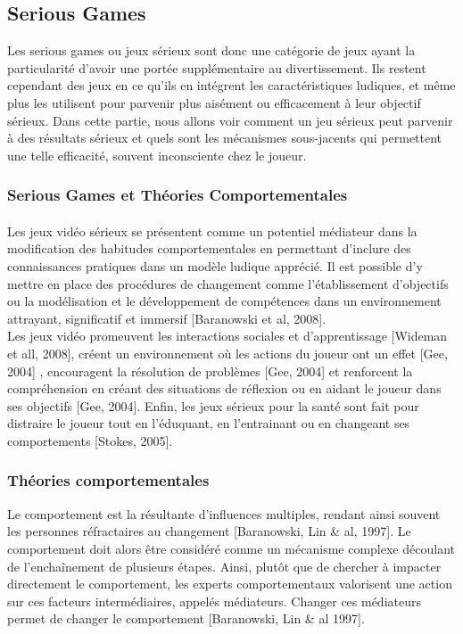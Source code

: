 \subsection{Serious Games}
Les serious games ou jeux sérieux sont donc une catégorie de jeux ayant la particularité d'avoir une portée supplémentaire au divertissement. Ils restent cependant des jeux en ce qu'ils en intégrent les caractéristiques ludiques, et même plus les utilisent pour parvenir plus aisément ou efficacement à leur objectif sérieux. Dans cette partie, nous allons voir comment un jeu sérieux  peut parvenir à des résultats sérieux et quels sont les mécanismes sous-jacents qui permettent une telle efficacité, souvent inconsciente chez le joueur.
	\subsubsection{Serious Games et Théories Comportementales }
			\paragraph{}
Les jeux vidéo sérieux se présentent comme un potentiel médiateur dans la modification des habitudes comportementales en permettant d’inclure des connaissances pratiques dans un modèle ludique apprécié. Il est possible d’y mettre en place des procédures de changement comme l’établissement d’objectifs ou la modélisation et le développement de compétences dans un environnement attrayant, significatif et immersif [Baranowski et al, 2008]\cite{Bara08}. \\
Les jeux vidéo promeuvent les interactions sociales et d’apprentissage [Wideman et all, 2008], créent un environnement où les actions du joueur ont un effet [Gee, 2004]\cite{Gee04} , encouragent la résolution de problèmes [Gee, 2004]\cite{Gee04} et renforcent la compréhension en créant des situations de réflexion ou en aidant le joueur dans ses objectifs [Gee, 2004]\cite{Gee04}. Enfin, les jeux sérieux pour la santé sont fait pour distraire le joueur tout en l’éduquant, en l’entrainant ou en changeant ses comportements [Stokes, 2005]\cite{Stok05}.

		\subsubsection*{Théories comportementales}
Le comportement est la résultante d’influences multiples, rendant ainsi souvent les personnes réfractaires au changement [Baranowski, Lin \& al, 1997]\cite{Bara97}. Le comportement doit alors être considéré comme un mécanisme complexe découlant de l’enchaînement de plusieurs étapes. Ainsi, plutôt que de chercher à impacter directement le comportement, les experts comportementaux valorisent une action sur ces facteurs intermédiaires, appelés médiateurs. Changer ces médiateurs permet de changer le comportement [Baranowski, Lin \& al 1997]\cite{Bara97}.
